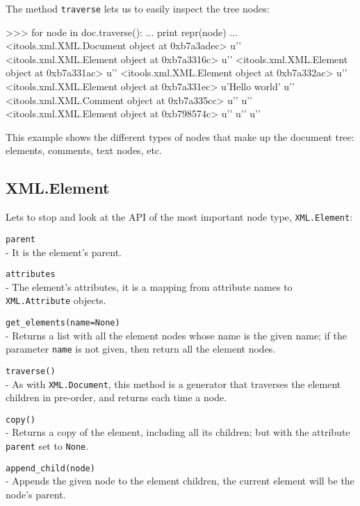 The method {\tt traverse} lets us to easily inspect the tree nodes:

\begin{code}
    >>> for node in doc.traverse():
    ...     print repr(node)
    ... 
    <itools.xml.XML.Document object at 0xb7a3adec>
    u'\n'
    <itools.xml.XML.Element object at 0xb7a3316c>
    u'\n  '
    <itools.xml.XML.Element object at 0xb7a331ac>
    u'\n    '
    <itools.xml.XML.Element object at 0xb7a332ac>
    u'\n    '
    <itools.xml.XML.Element object at 0xb7a331ec>
    u'Hello world'
    u'\n    '
    <itools.xml.XML.Comment object at 0xb7a335cc>
    u'\n  '
    u'\n  '
    <itools.xml.XML.Element object at 0xb798574c>
    u'\n  '
    u'\n'
    u'\n'
\end{code}

This example shows the different types of nodes that make up the document
tree: elements, comments, text nodes, etc.

\subsection{XML.Element}

Lets to stop and look at the API of the most important node type,
{\tt XML.Element}:

\begin{api}
    {\tt parent}\\
    - It is the element's parent.

    {\tt attributes}\\
    - The element's attributes, it is a mapping from attribute names to
    {\tt XML.Attribute} objects.

    {\tt get\_elements(name=None)}\\
    - Returns a list with all the element nodes whose name is the given
    name; if the parameter {\tt name} is not given, then return all the
    element nodes.

    {\tt traverse()}\\
    - As with {\tt XML.Document}, this method is a generator that traverses
    the element children in pre-order, and returns each time a node.

    {\tt copy()}\\
    - Returns a copy of the element, including all its children; but with
    the attribute {\tt parent} set to {\tt None}.

    {\tt append\_child(node)}\\
    - Appends the given node to the element children, the current element will
    be the node's parent.
\end{api}


